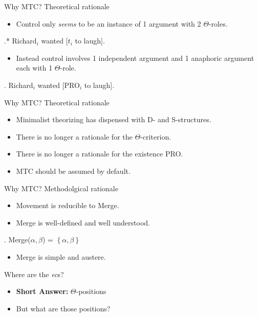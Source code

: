 \documentclass{beamer}
\begin{document}
\begin{frame}
  {Why MTC?}
  {Theoretical rationale \parencite[see also][]{hornstein2001move}}
  \begin{itemize}
    \item Control only \textit{seems} to be an instance of 1 argument with 2 $\Theta$-roles.
  \end{itemize}
  \ex.* Richard$_i$ wanted [$t_i$ to laugh].

  \begin{itemize}
    \item Instead control involves 1 independent argument and 1 anaphoric argument each with 1 $\Theta$-role.
  \end{itemize}
  \ex. Richard$_i$ wanted [PRO$_i$ to laugh].

\end{frame}
\begin{frame}
  {Why MTC?}
  {Theoretical rationale \parencite[see also][]{hornstein2001move}}

  \begin{itemize}
    \item Minimalist theorizing has dispensed with D- and S-structures.
      \pause
    \item There is no longer a rationale  for the $\Theta$-criterion.
      \pause
    \item There is no longer a rationale for the existence PRO.
      \pause
    \item MTC should be assumed by default.
  \end{itemize}
\end{frame}
\begin{frame}
  {Why MTC?}
  {Methodolgical rationale}

  \begin{itemize}
    \item Movement is reducible to Merge. \parencite{XXXX}
    \item Merge is well-defined and well understood.
  \end{itemize}
  \ex. Merge($\alpha, \beta$) = $\left\{ \alpha, \beta \right\}$

  \begin{itemize}
    \item Merge is simple and austere.
  \end{itemize}
\end{frame}
\begin{frame}
  {Where are the \textit{ec}s?}
  \begin{itemize}
    \item \textbf{Short Answer:} $\Theta$-positions
    \item But what are those positions?
  \end{itemize}
\end{frame}
\end{document}

